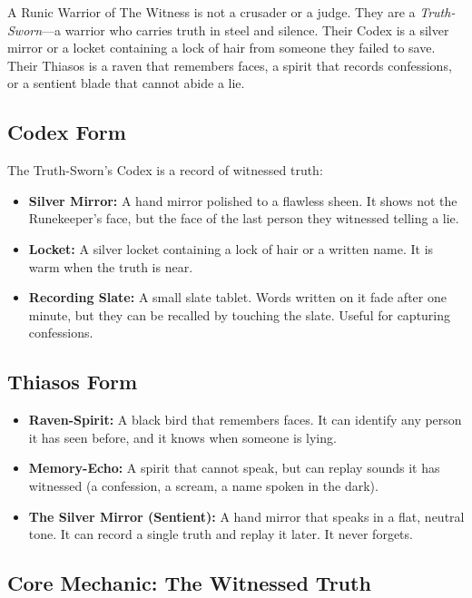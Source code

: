 A Runic Warrior of The Witness is not a crusader or a judge. They are a \textit{Truth-Sworn}—a warrior who carries truth in steel and silence. Their Codex is a silver mirror or a locket containing a lock of hair from someone they failed to save. Their Thiasos is a raven that remembers faces, a spirit that records confessions, or a sentient blade that cannot abide a lie.

\subsection{Codex Form}

The Truth-Sworn's Codex is a record of witnessed truth:

\begin{itemize}
\item \textbf{Silver Mirror:} A hand mirror polished to a flawless sheen. It shows not the Runekeeper's face, but the face of the last person they witnessed telling a lie.
\item \textbf{Locket:} A silver locket containing a lock of hair or a written name. It is warm when the truth is near.
\item \textbf{Recording Slate:} A small slate tablet. Words written on it fade after one minute, but they can be recalled by touching the slate. Useful for capturing confessions.
\end{itemize}

\subsection{Thiasos Form}

\begin{itemize}
\item \textbf{Raven-Spirit:} A black bird that remembers faces. It can identify any person it has seen before, and it knows when someone is lying.
\item \textbf{Memory-Echo:} A spirit that cannot speak, but can replay sounds it has witnessed (a confession, a scream, a name spoken in the dark).
\item \textbf{The Silver Mirror (Sentient):} A hand mirror that speaks in a flat, neutral tone. It can record a single truth and replay it later. It never forgets.
\end{itemize}

\subsection{Core Mechanic: The Witnessed Truth}

